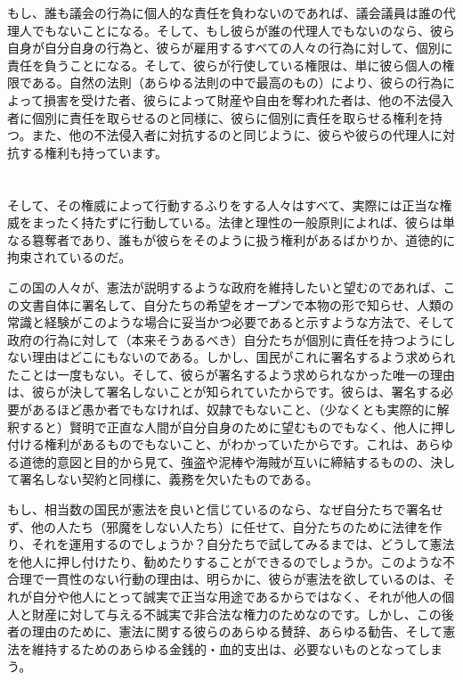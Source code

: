 \documentclass[dvipdfmx, uplatex, tate, landscape]{utbook}
\begin{document}
もし、誰も議会の行為に個人的な責任を負わないのであれば、議会議員は誰の代理人でもないことになる。そして、もし彼らが誰の代理人でもないのなら、彼ら自身が自分自身の行為と、彼らが雇用するすべての人々の行為に対して、個別に責任を負うことになる。そして、彼らが行使している権限は、単に彼ら個人の権限である。自然の法則（あらゆる法則の中で最高のもの）により、彼らの行為によって損害を受けた者、彼らによって財産や自由を奪われた者は、他の不法侵入者に個別に責任を取らせるのと同様に、彼らに個別に責任を取らせる権利を持つ。また、他の不法侵入者に対抗するのと同じように、彼らや彼らの代理人に対抗する権利も持っています。

\chapter{}

そして、その権威によって行動するふりをする人々はすべて、実際には正当な権威をまったく持たずに行動している。法律と理性の一般原則によれば、彼らは単なる簒奪者であり、誰もが彼らをそのように扱う権利があるばかりか、道徳的に拘束されているのだ。

この国の人々が、憲法が説明するような政府を維持したいと望むのであれば、この文書自体に署名して、自分たちの希望をオープンで本物の形で知らせ、人類の常識と経験がこのような場合に妥当かつ必要であると示すような方法で、そして政府の行為に対して（本来そうあるべき）自分たちが個別に責任を持つようにしない理由はどこにもないのである。しかし、国民がこれに署名するよう求められたことは一度もない。そして、彼らが署名するよう求められなかった唯一の理由は、彼らが決して署名しないことが知られていたからです。彼らは、署名する必要があるほど愚か者でもなければ、奴隷でもないこと、（少なくとも実際的に解釈すると）賢明で正直な人間が自分自身のために望むものでもなく、他人に押し付ける権利があるものでもないこと、がわかっていたからです。これは、あらゆる道徳的意図と目的から見て、強盗や泥棒や海賊が互いに締結するものの、決して署名しない契約と同様に、義務を欠いたものである。

もし、相当数の国民が憲法を良いと信じているのなら、なぜ自分たちで署名せず、他の人たち（邪魔をしない人たち）に任せて、自分たちのために法律を作り、それを運用するのでしょうか？自分たちで試してみるまでは、どうして憲法を他人に押し付けたり、勧めたりすることができるのでしょうか。このような不合理で一貫性のない行動の理由は、明らかに、彼らが憲法を欲しているのは、それが自分や他人にとって誠実で正当な用途であるからではなく、それが他人の個人と財産に対して与える不誠実で非合法な権力のためなのです。しかし、この後者の理由のために、憲法に関する彼らのあらゆる賛辞、あらゆる勧告、そして憲法を維持するためのあらゆる金銭的・血的支出は、必要ないものとなってしまう。
\end{document}
